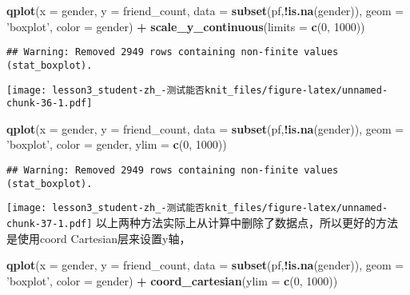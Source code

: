 \documentclass[]{article}
\newenvironment{Shaded}{\begin{snugshade}}{\end{snugshade}}
\newcommand{\DataTypeTok}[1]{\textcolor[rgb]{0.13,0.29,0.53}{#1}}
\newcommand{\DecValTok}[1]{\textcolor[rgb]{0.00,0.00,0.81}{#1}}
\newcommand{\KeywordTok}[1]{\textcolor[rgb]{0.13,0.29,0.53}{\textbf{#1}}}
\newcommand{\NormalTok}[1]{#1}
\newcommand{\OperatorTok}[1]{\textcolor[rgb]{0.81,0.36,0.00}{\textbf{#1}}}
\newcommand{\StringTok}[1]{\textcolor[rgb]{0.31,0.60,0.02}{#1}}
\begin{document}
\begin{Shaded}
\begin{Highlighting}[]
\KeywordTok{qplot}\NormalTok{(}\DataTypeTok{x =}\NormalTok{ gender, }\DataTypeTok{y =}\NormalTok{ friend_count,}
      \DataTypeTok{data =} \KeywordTok{subset}\NormalTok{(pf,}\OperatorTok{!}\KeywordTok{is.na}\NormalTok{(gender)), }
      \DataTypeTok{geom =} \StringTok{'boxplot'}\NormalTok{, }\DataTypeTok{color =}\NormalTok{ gender) }\OperatorTok{+}
\StringTok{  }\KeywordTok{scale_y_continuous}\NormalTok{(}\DataTypeTok{limits =} \KeywordTok{c}\NormalTok{(}\DecValTok{0}\NormalTok{, }\DecValTok{1000}\NormalTok{))}
\end{Highlighting}
\end{Shaded}

\begin{verbatim}
## Warning: Removed 2949 rows containing non-finite values (stat_boxplot).
\end{verbatim}

\texttt{[image: lesson3\_student-zh\_-测试能否knit\_files/figure-latex/unnamed-chunk-36-1.pdf]}

\begin{Shaded}
\begin{Highlighting}[]
\KeywordTok{qplot}\NormalTok{(}\DataTypeTok{x =}\NormalTok{ gender, }\DataTypeTok{y =}\NormalTok{ friend_count,}
      \DataTypeTok{data =} \KeywordTok{subset}\NormalTok{(pf,}\OperatorTok{!}\KeywordTok{is.na}\NormalTok{(gender)), }
      \DataTypeTok{geom =} \StringTok{'boxplot'}\NormalTok{, }\DataTypeTok{color =}\NormalTok{ gender, }\DataTypeTok{ylim =} \KeywordTok{c}\NormalTok{(}\DecValTok{0}\NormalTok{, }\DecValTok{1000}\NormalTok{))}
\end{Highlighting}
\end{Shaded}

\begin{verbatim}
## Warning: Removed 2949 rows containing non-finite values (stat_boxplot).
\end{verbatim}

\texttt{[image: lesson3\_student-zh\_-测试能否knit\_files/figure-latex/unnamed-chunk-37-1.pdf]}
以上两种方法实际上从计算中删除了数据点，所以更好的方法是使用coord
Cartesian层来设置y轴，

\begin{Shaded}
\begin{Highlighting}[]
\KeywordTok{qplot}\NormalTok{(}\DataTypeTok{x =}\NormalTok{ gender, }\DataTypeTok{y =}\NormalTok{ friend_count,}
      \DataTypeTok{data =} \KeywordTok{subset}\NormalTok{(pf,}\OperatorTok{!}\KeywordTok{is.na}\NormalTok{(gender)), }
      \DataTypeTok{geom =} \StringTok{'boxplot'}\NormalTok{, }\DataTypeTok{color =}\NormalTok{ gender) }\OperatorTok{+}
\StringTok{  }\KeywordTok{coord_cartesian}\NormalTok{(}\DataTypeTok{ylim =} \KeywordTok{c}\NormalTok{(}\DecValTok{0}\NormalTok{, }\DecValTok{1000}\NormalTok{))}
\end{Highlighting}
\end{Shaded}
\end{document}
